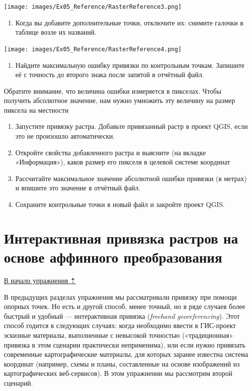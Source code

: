 \documentclass[
  12pt,
]{book}
\providecommand{\tightlist}{%
  \setlength{\itemsep}{0pt}\setlength{\parskip}{0pt}}
\begin{document}
\texttt{[image: images/Ex05\_Reference/RasterReference3.png]}

\begin{enumerate}
\def\labelenumi{\arabic{enumi}.}
\setcounter{enumi}{4}
\tightlist
\item
  Когда вы добавите дополнительные точки, отключите их: снимите галочки в таблице возле их названий.
\end{enumerate}

\texttt{[image: images/Ex05\_Reference/RasterReference4.png]}

\begin{enumerate}
\def\labelenumi{\arabic{enumi}.}
\setcounter{enumi}{5}
\tightlist
\item
  Найдите максимальную ошибку привязки по контрольным точкам. Запишите её с точность до второго знака после запятой в отчётный файл.
\end{enumerate}

Обратите внимание, что величина ошибки измеряется в пикселах. Чтобы получить абсолютное значение, нам нужно умножить эту величину на размер пиксела на местности

\begin{enumerate}
\def\labelenumi{\arabic{enumi}.}
\setcounter{enumi}{6}
\item
  Запустите привязку растра. Добавьте привязанный растр в проект QGIS, если это не произошло автоматически.
\item
  Откройте свойства добавленного растра и выясните (на вкладке «Информация»), каков размер его пикселя в целевой системе координат
\item
  Рассчитайте максимальное значение абсолютной ошибки привязки (в метрах) и впишите это значение в отчётный файл.
\item
  Сохраните контрольные точки в новый файл и закройте проект QGIS.
\end{enumerate}

\hypertarget{raster-reference-linear}{%
\section{Интерактивная привязка растров на основе аффинного преобразования}\label{raster-reference-linear}}

\protect\hyperlink{raster-reference}{В начало упражнения ⇡}

В предыдущих разделах упражнения мы рассматривали привязку при помощи опорных точек. Но есть и другой способ, менее точный, но в ряде случаев более быстрый и удобный --- интерактивная привязка (\emph{freehand georeferencing}). Этот способ годится в следующих случаях: когда необходимо ввести в ГИС-проект эскизные материалы, выполненные с невысокой точностью («традиционная» привязка в этом сценарии практически неприменима), или если нужно привязать современные картографические материалы, для которых заранее известна система координат (например, схемы и планы, составленные на основе изображений из картографических веб-сервисов). В этом упражнении мы рассмотрим второй сценарий.
\end{document}
